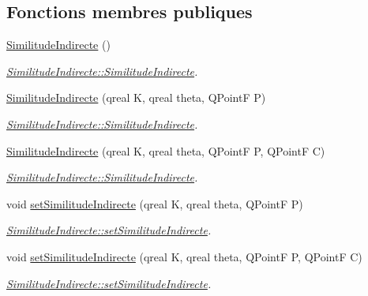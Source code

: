 \subsection*{Fonctions membres publiques}
\begin{DoxyCompactItemize}
\item 
\hyperlink{class_similitude_indirecte_a3f38af24b7ab4c26c96a6f67aa6b5ed4}{Similitude\+Indirecte} ()
\begin{DoxyCompactList}\small\item\em \hyperlink{class_similitude_indirecte_a3f38af24b7ab4c26c96a6f67aa6b5ed4}{Similitude\+Indirecte\+::\+Similitude\+Indirecte}. \end{DoxyCompactList}\item 
\hyperlink{class_similitude_indirecte_a163c2a1ce46d77570755e72c9e9b7ea6}{Similitude\+Indirecte} (qreal K, qreal theta, Q\+Point\+F P)
\begin{DoxyCompactList}\small\item\em \hyperlink{class_similitude_indirecte_a3f38af24b7ab4c26c96a6f67aa6b5ed4}{Similitude\+Indirecte\+::\+Similitude\+Indirecte}. \end{DoxyCompactList}\item 
\hyperlink{class_similitude_indirecte_a2d19403d78f488b0acaac269320176c4}{Similitude\+Indirecte} (qreal K, qreal theta, Q\+Point\+F P, Q\+Point\+F C)
\begin{DoxyCompactList}\small\item\em \hyperlink{class_similitude_indirecte_a3f38af24b7ab4c26c96a6f67aa6b5ed4}{Similitude\+Indirecte\+::\+Similitude\+Indirecte}. \end{DoxyCompactList}\item 
void \hyperlink{class_similitude_indirecte_aeacc6c5446e47385e70f385e6796f4ef}{set\+Similitude\+Indirecte} (qreal K, qreal theta, Q\+Point\+F P)
\begin{DoxyCompactList}\small\item\em \hyperlink{class_similitude_indirecte_aeacc6c5446e47385e70f385e6796f4ef}{Similitude\+Indirecte\+::set\+Similitude\+Indirecte}. \end{DoxyCompactList}\item 
void \hyperlink{class_similitude_indirecte_a0ca3f4cdc2eb804513fa46e1fbc8534f}{set\+Similitude\+Indirecte} (qreal K, qreal theta, Q\+Point\+F P, Q\+Point\+F C)
\begin{DoxyCompactList}\small\item\em \hyperlink{class_similitude_indirecte_aeacc6c5446e47385e70f385e6796f4ef}{Similitude\+Indirecte\+::set\+Similitude\+Indirecte}. \end{DoxyCompactList}\end{DoxyCompactItemize}
